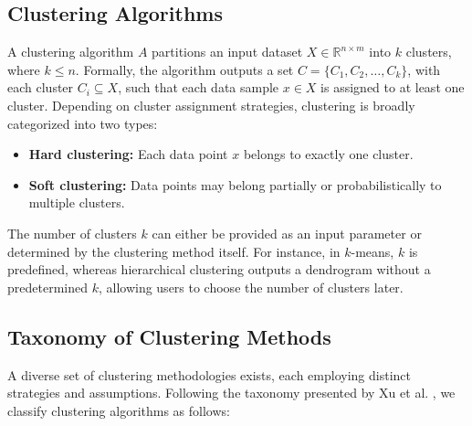 \subsection{Clustering Algorithms}
A clustering algorithm \(A\) partitions an input dataset \(X \in
\mathbb{R}^{n \times m}\) into \(k\) clusters, where \(k \leq n\).
Formally, the algorithm outputs a set \(C = \{C_1, C_2, \dots,
C_k\}\), with each cluster \(C_i \subseteq X\), such that each data
sample \(x \in X\) is assigned to at least one cluster. Depending on
cluster assignment strategies, clustering is broadly categorized into two types:

\begin{itemize}
  \item \textbf{Hard clustering:} Each data point \(x\) belongs to
    exactly one cluster.
  \item \textbf{Soft clustering:} Data points may belong partially or
    probabilistically to multiple clusters.
\end{itemize}

The number of clusters \(k\) can either be provided as an input
parameter or determined by the clustering method itself. For
instance, in \(k\)-means, \(k\) is predefined, whereas hierarchical
clustering outputs a dendrogram without a predetermined \(k\),
allowing users to choose the number of clusters later.

\subsection{Taxonomy of Clustering Methods}
A diverse set of clustering methodologies exists, each employing
distinct strategies and assumptions. Following the taxonomy presented
by Xu et al. \cite{XuSurvey}, we classify clustering algorithms as follows:


